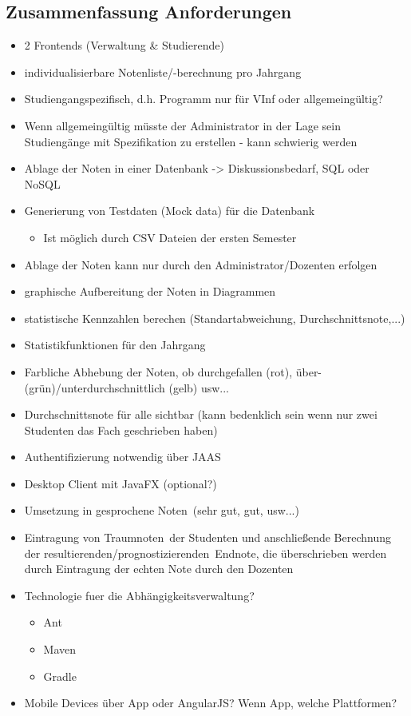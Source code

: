 \documentclass[12pt,a4paper,parskip]{scrreprt}
\begin{document}
\subsection{Zusammenfassung Anforderungen}
\begin{itemize}
\item 2 Frontends (Verwaltung \& Studierende)
\item individualisierbare Notenliste/-berechnung pro Jahrgang
\item Studiengangspezifisch, d.h. Programm nur für VInf oder allgemeingültig?
\item Wenn allgemeingültig müsste der Administrator in der Lage sein Studiengänge mit Spezifikation zu erstellen - kann schwierig werden

\item Ablage der Noten in einer Datenbank -> Diskussionsbedarf, SQL oder NoSQL
\item Generierung von Testdaten (Mock data) für die Datenbank
\begin{itemize}
	\item Ist möglich durch CSV Dateien der ersten Semester
\end{itemize}
\item Ablage der Noten kann nur durch den Administrator/Dozenten erfolgen
\item graphische Aufbereitung der Noten in Diagrammen
\item statistische Kennzahlen berechen (Standartabweichung, Durchschnittsnote,...)
\item Statistikfunktionen für den Jahrgang
\item Farbliche Abhebung der Noten, ob durchgefallen (rot), über- (grün)/unterdurchschnittlich (gelb) usw...
\item Durchschnittsnote für alle sichtbar (kann bedenklich sein wenn nur zwei Studenten das Fach geschrieben haben)
\item Authentifizierung notwendig über JAAS
\item Desktop Client mit JavaFX (optional?)
\item Umsetzung in \glqq gesprochene Noten\grqq\ (sehr gut, gut, usw...)
\item Eintragung von \glqq Traumnoten\grqq\ der Studenten und anschließende Berechnung der \glqq resultierenden/prognostizierenden\grqq\ Endnote, die überschrieben werden durch Eintragung der echten Note durch den Dozenten
\item Technologie fuer die Abhängigkeitsverwaltung?
\begin{itemize}
\item Ant
\item Maven
\item Gradle
\end{itemize}
\item Mobile Devices über App oder AngularJS? Wenn App, welche Plattformen?
\end{itemize}
\end{document}
